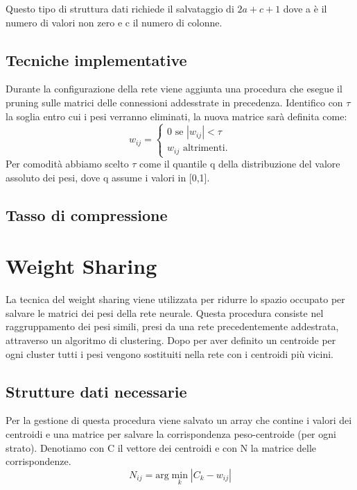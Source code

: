 \documentclass[11pt,a4paper,twoside,
openright]{book}
\begin{document}
Questo tipo di struttura dati richiede il salvataggio di $2a+c+1$ dove a è il numero di valori non zero e c il numero di colonne.
\subsection{Tecniche implementative}
Durante la configurazione della rete viene aggiunta una procedura che esegue il pruning sulle matrici delle connessioni addesstrate in precedenza. Identifico con $\tau$ la soglia entro cui i pesi verranno eliminati, la nuova matrice sarà definita come:
\begin{equation}
w_{ij}=
\begin{cases}
0 \text{ se } |w_{ij}|<\tau \\
w_{ij} \text{ altrimenti}.
\end{cases}
\label{pruning}
\end{equation}
Per comodità abbiamo scelto $\tau$ come il quantile q della distribuzione del valore assoluto dei pesi, dove q assume i valori in [0,1].

\subsection{Tasso di compressione}


\section{Weight Sharing}
La tecnica del weight sharing viene utilizzata per ridurre lo spazio occupato per salvare le matrici dei pesi della rete neurale. Questa procedura consiste nel raggruppamento dei pesi simili, presi da una rete precedentemente addestrata, attraverso un algoritmo di clustering. Dopo per aver definito un centroide per ogni cluster tutti i pesi vengono sostituiti nella rete con i centroidi più vicini.

\subsection{Strutture dati necessarie}
Per la gestione di questa procedura viene salvato un array che contine i valori dei centroidi e una matrice per salvare la corrispondenza peso-centroide (per ogni strato).
Denotiamo con C il vettore dei centroidi e con N la matrice delle corrispondenze.
\begin{equation}
N_{ij} = \text{arg}\min\limits_{k}|C_{k}-w_{ij}|
\label{ws}
\end{equation}
\end{document}
